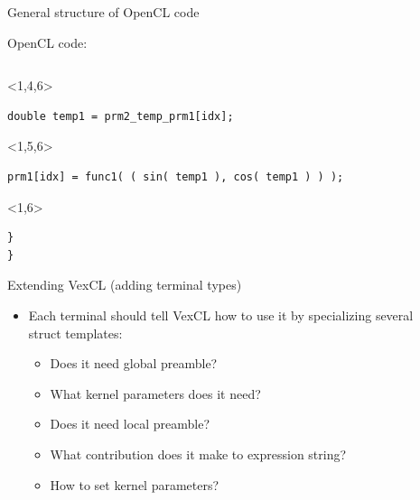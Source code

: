\documentclass[@BEAMER_OPTIONS@]{beamer}
\begin{document}
\begin{frame}[fragile,shrink=5]{General structure of OpenCL code}
\begin{exampleblock}{OpenCL code:}
\begin{uncoverenv}
\begin{lstlisting}[firstnumber=last]
            \end{lstlisting}
        \end{uncoverenv}
        \begin{uncoverenv}<1,4,6>
            \begin{lstlisting}[firstnumber=last]
        double temp1 = prm2_temp_prm1[idx];
            \end{lstlisting}
        \end{uncoverenv}
        \begin{uncoverenv}<1,5,6>
            \begin{lstlisting}[firstnumber=last]
        prm1[idx] = func1( ( sin( temp1 ), cos( temp1 ) ) );
            \end{lstlisting}
        \end{uncoverenv}
        \begin{uncoverenv}<1,6>
            \begin{lstlisting}[firstnumber=last]
    }
}
            \end{lstlisting}
        \end{uncoverenv}
    \end{exampleblock}
\end{frame}

\begin{frame}{Extending VexCL (adding terminal types)}
    \begin{itemize}
        \item Each terminal should tell VexCL how to use it by specializing
            several\\ struct templates:
            \begin{itemize}
                \item Does it need global preamble?
                \item What kernel parameters does it need?
                \item Does it need local preamble?
                \item What contribution does it make to expression string?
                \item How to set kernel parameters?
            \end{itemize}
    \end{itemize}
\end{frame}
\end{document}
